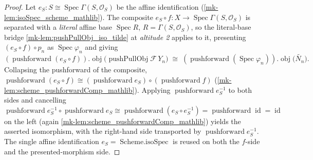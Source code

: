 \begin{proof}
  Let \(e_S : S \cong \operatorname{Spec}\Gamma(S, \mathcal{O}_S)\) be the affine identification
  (\ref{mk-lem:isoSpec_scheme_mathlib}). The composite
  \(e_S \circ f : X \to \operatorname{Spec}\Gamma(S, \mathcal{O}_S)\) is separated with a
  \emph{literal} affine base \(\operatorname{Spec} R\), \(R = \Gamma(S, \mathcal{O}_S)\), so the
  literal-base bridge \ref{mk-lem:pushPullObj_iso_tilde} at \emph{altitude 2} applies to it,
  presenting \((e_S \circ f) \circ p_n\) as \(\operatorname{Spec}\varphi_n\) and giving
  \[
    (\operatorname{pushforward}(e_S \circ f)).\!\operatorname{obj}\bigl(\operatorname{pushPullObj}
      \mathcal{F}\, Y_n\bigr)
    \;\cong\;
    (\operatorname{pushforward}(\operatorname{Spec}\varphi_n)).\!\operatorname{obj}\bigl(
      \widetilde{N_n}\bigr).
  \]
  Collapsing the pushforward of the composite,
  \(\operatorname{pushforward}(e_S \circ f) \cong (\operatorname{pushforward} e_S) \circ
  (\operatorname{pushforward} f)\) (\ref{mk-lem:scheme_pushforwardComp_mathlib}). Applying
  \(\operatorname{pushforward} e_S^{-1}\) to both sides and cancelling
  \(\operatorname{pushforward} e_S^{-1} \circ \operatorname{pushforward} e_S \cong
  \operatorname{pushforward}(e_S \circ e_S^{-1}) = \operatorname{pushforward}\operatorname{id} =
  \operatorname{id}\) on the left (again \ref{mk-lem:scheme_pushforwardComp_mathlib}) yields the
  asserted isomorphism, with the right-hand side transported by
  \(\operatorname{pushforward} e_S^{-1}\). The single affine identification
  \(e_S = \operatorname{Scheme.isoSpec}\) is reused on both the \(f\)-side and the
  presented-morphism side.
\end{proof}

